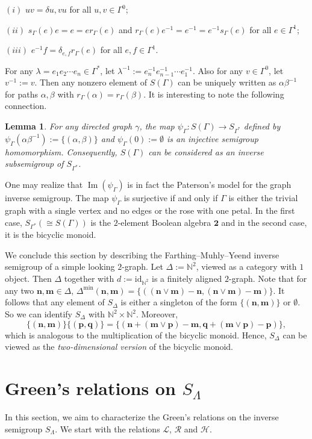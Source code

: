 \documentclass[a4paper,reqno,11pt]{amsart}
\numberwithin{equation}{section}
\newtheorem{lem}[thm]{Lemma}
\theoremstyle{definition}
\theoremstyle{remark}
\newcommand{\image}{\operatorname{Im}}
\newcommand{\N}{\mathbf{n}}
\newcommand{\M}{\mathbf{m}}
\newcommand{\bP}{\mathbf{p}}
\newcommand{\Q}{\mathbf{q}}
\begin{document}
$(i)$ $uv=\delta{u,v}u$ for all $u,v\in \Gamma^0$;

$(ii)$ $s_\Gamma(e)e=e=er_\Gamma(e)$ and $r_\Gamma(e)e^{-1}=e^{-1}=e^{-1}s_\Gamma(e)$ for all $e\in \Gamma^1$;

$(iii)$ $e^{-1}f=\delta_{e,f}r_\Gamma(e)$ for all $e,f\in \Gamma^1$. 

For any $\lambda=e_1 e_2\cdots e_n\in \Gamma^*$, let $\lambda^{-1}:=e_n^{-1} e_{n-1}^{-1} \cdots e_1^{-1}$. Also for any $v\in \Gamma^0$, let $v^{-1}:=v$. Then any nonzero element of $S(\Gamma)$ can be uniquely written as $\alpha\beta^{-1}$ for paths $\alpha,\beta$ with $r_\Gamma(\alpha)=r_\Gamma(\beta)$. It is interesting to note the following connection.
\begin{lem}\label{lem the relation between gis and S_Lambda}
For any directed graph $\gamma$, the map $\psi_\Gamma:S(\Gamma)\longrightarrow S_{\Gamma^*}$ defined by $\psi_\Gamma(\alpha\beta^{-1}):=\{(\alpha,\beta)\}$ and $\psi_\Gamma(0):=\emptyset$ is an injective semigroup homomorphism. Consequently, $S(\Gamma)$ can be considered as an inverse subsemigroup of $S_{\Gamma^*}$.
\end{lem}
One may realize that $\image(\psi_\Gamma)$ is in fact the Paterson's model \cite{Paterson} for the graph inverse semigroup. The map $\psi_\Gamma$ is surjective if and only if $\Gamma$ is either the trivial graph with a single vertex and no edges or the rose with one petal. In the first case, $S_{\Gamma^*}(\cong S(\Gamma))$ is the $2$-element Boolean algebra $\textbf{2}$ and in the second case, it is the bicyclic monoid. 

We conclude this section by describing the Farthing--Muhly--Yeend inverse semigroup of a simple looking $2$-graph. Let $\Delta:=\mathbb{N}^2$, viewed as a category with $1$ object. Then $\Delta$ together with $d:=\text{id}_{\mathbb{N}^2}$ is a finitely aligned $2$-graph. Note that for any two $\N,\M\in \Delta$, $\Delta^{\min}(\N,\M)=\{\left((\N\vee \M)-\N,(\N\vee \M)-\M\right)\}$. It follows that any element of $S_\Delta$ is either a singleton of the form $\{(\N,\M)\}$ or $\emptyset$. So we can identify $S_\Delta$ with $\mathbb{N}^2\times \mathbb{N}^2$. Moreover, \[\{(\N,\M)\}\{(\bP,\Q)\}=\{\left(\N+(\M\vee \bP)-\M,\Q+(\M\vee \bP)-\bP\right)\},\] which is analogous to the multiplication of the bicyclic monoid. Hence, $S_\Delta$ can be viewed as the \emph{two-dimensional version} of the bicyclic monoid. 

\section{Green's relations on \texorpdfstring{$S_\Lambda$}{SΛ}}\label{sec Green's relations}
In this section, we aim to characterize the Green's relations on the inverse semigroup $S_\Lambda$. We start with the relations $\mathscr{L}$, $\mathscr{R}$ and $\mathscr{H}$.
\end{document}
